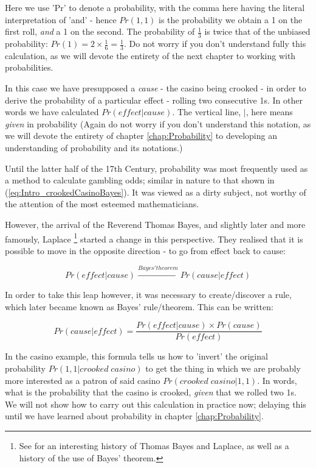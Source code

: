 \documentclass[11pt,fullpage]{book}
\begin{document}
Here we use 'Pr' to denote a probability, with the comma here having the literal interpretation of 'and' - hence $Pr(1,1)$ is the probability we obtain a 1 on the first roll, \textit{and} a 1 on the second. The probability of $\frac{1}{3}$ is twice that of the unbiased probability: $Pr(1) = 2\times\frac{1}{6} = \frac{1}{3}$. Do not worry if you don't understand fully this calculation, as we will devote the entirety of the next chapter to working with probabilities.

In this case we have presupposed a \textit{cause} - the casino being crooked - in order to derive the probability of a particular effect - rolling two consecutive 1s. In other words we have calculated $Pr(effect|cause)$. The vertical line, $|$, here means \textit{given} in probability (Again do not worry if you don't understand this notation, as we will devote the entirety of chapter \ref{chap:Probability} to developing an understanding of probability and its notations.) 

Until the latter half of the 17th Century, probability was most frequently used as a method to calculate gambling odds; similar in nature to that shown in (\ref{eq:Intro_crookedCasinoBayes}). It was viewed as a dirty subject, not worthy of the attention of the most esteemed mathematicians.

However, the arrival of the Reverend Thomas Bayes, and slightly later and more famously, Laplace \footnote{See \cite{mcgrayne2011theory} for an interesting history of Thomas Bayes and Laplace, as well as a history of the use of Bayes' theorem.} started a change in this perspective. They realised that it is possible to move in the opposite direction - to go from effect back to cause:

\begin{equation}
Pr(effect|cause) \xrightarrow{Bayes' theorem} Pr(cause|effect)
\end{equation}

In order to take this leap however, it was necessary to create/discover a rule, which later became known as Bayes' rule/theorem. This can be written:

\begin{equation}\label{eq:Intro_BayesRuleCauseEffect}
Pr(cause|effect) = \frac{Pr(effect|cause)\times Pr(cause)}{Pr(effect)}
\end{equation}

In the casino example, this formula tells us how to 'invert' the original probability $Pr(1,1|crooked\;casino)$ to get the thing in which we are probably more interested as a patron of said casino $Pr(crooked\;casino|1,1)$. In words, what is the probability that the casino is crooked, \textit{given} that we rolled two 1s. We will not show how to carry out this calculation in practice now; delaying this until we have learned about probability in chapter \ref{chap:Probability}.
\end{document}
